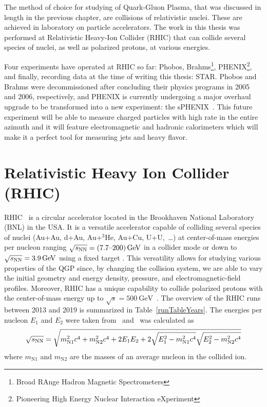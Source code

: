 The method of choice for studying of Quark-Gluon Plasma, that was discussed in length in the previous chapter, are collisions of relativistic nuclei. These are achieved in laboratory on particle accelerators. The work in this thesis was performed at Relativistic Heavy-Ion Collider (RHIC) that can collide several species of nuclei, as well as polarized protons, at various energies. 


Four experiments have operated at RHIC so far: Phobos, Brahms\footnote{Broad RAnge Hadron Magnetic Spectrometers}, PHENIX\footnote{Pioneering High Energy Nuclear Interaction eXperiment}, and finally, recording data at the time of writing this thesis: STAR. Phobos and Brahms were decommissioned after concluding their physics programs in 2005 and 2006, respectively, and PHENIX is currently undergoing a major overhaul upgrade to be transformed into a new experiment: the sPHENIX~\cite{sphenix}. This future experiment will be able to measure charged particles with high rate in the entire azimuth and it will feature electromagnetic and hadronic calorimeters which will make it a perfect tool for measuring jets and heavy flavor.


\section{Relativistic Heavy Ion Collider (RHIC)\label{RHIC}}

RHIC~\cite{RHICproject, RHICdesign} is a circular accelerator located in the Brookhaven National Laboratory 
(BNL) in the USA\@. It is a versatile accelerator capable of
colliding several species of nuclei (Au+Au, d+Au, Au+$^3$He, Au+Cu, U+U,~\dots) at
center-of-mass energies per nucleon
ranging $\sqrt{s_\text{NN}} = (\text{7.7--200})\,\si{\giga\electronvolt}$ in a collider mode or down to
$\sqrt{s_\text{NN}} = 3.9\,\si{\giga\electronvolt}$
using a fixed target \cite{fixedTarget}\@. This versatility allows for studying various properties of the QGP since, by changing the collision system, we are able to vary the initial geometry and energy density, pressure, and electromagnetic-field profiles. Moreover, RHIC has a unique capability to collide polarized protons with
the center-of-mass energy up to $\sqrt{s} = \SI{500}{\giga\electronvolt}$~\cite{polarizedProtons}\@. The overview
of the RHIC runs between 2013 and 2019 is summarized in Table~\ref{runTableYears}\@. The energies per nucleon $E_1$ and $E_2$ were taken from~\cite{RHICrunsTable} and \snn\ was calculated as
\begin{equation}
 \sqrt{s_\text{NN}} = \sqrt{m_\mathrm{N1}^2c^4 + m_\mathrm{N2}^2c^4 + 2E_1E_2 + 2\sqrt{E_1^2-m_\mathrm{N1}^2c^4}\sqrt{E_2^2-m_\mathrm{N2}^2c^4}}
\end{equation}
where $m_\mathrm{N1}$ and $m_\mathrm{N2}$ are the masses of an average nucleon in the collided ion.


